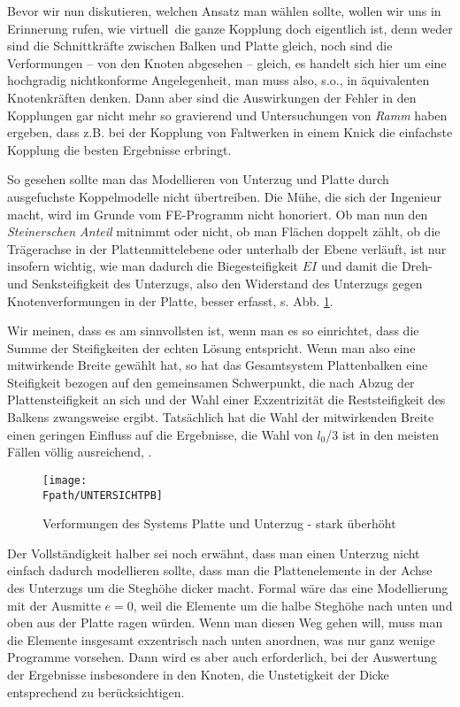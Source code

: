 Bevor wir nun diskutieren, welchen Ansatz man w\"{a}hlen sollte, wollen wir uns in Erinnerung rufen, wie \glq virtuell\grq\ die ganze Kopplung doch eigentlich ist, denn weder sind die Schnittkr\"{a}fte zwischen Balken und Platte gleich, noch sind die Verformungen -- von den Knoten abgesehen -- gleich, es handelt sich hier um eine hochgradig nichtkonforme Angelegenheit, man muss also, s.o., in \"{a}quivalenten Knotenkr\"{a}ften denken. Dann aber sind die Auswirkungen der Fehler in den Kopplungen gar nicht mehr so gravierend und Untersuchungen von {\em Ramm\/} \cite{Ramm4} haben ergeben, dass z.B. bei der Kopplung von Faltwerken in einem Knick die einfachste Kopplung die besten Ergebnisse erbringt.

So gesehen sollte man das Modellieren von Unterzug und Platte durch ausgefuchste Koppelmodelle nicht \"{u}bertreiben. Die M\"{u}he, die sich der Ingenieur macht, wird im Grunde vom FE-Programm nicht honoriert. Ob man nun den {\em Steinerschen Anteil\/} mitnimmt oder nicht, ob man Fl\"{a}chen doppelt z\"{a}hlt, ob die Tr\"{a}gerachse in der Plattenmittelebene oder unterhalb der Ebene verl\"{a}uft, ist nur insofern wichtig, wie man dadurch die Biegesteifigkeit $EI$ und damit die Dreh- und Senksteifigkeit des Unterzugs, also den Widerstand des Unterzugs gegen Knotenverformungen in der Platte, besser erfasst, s. Abb. \ref{UntersichtPB}.

Wir meinen, dass es am sinnvollsten ist, wenn man es so einrichtet, dass die Summe der Steifigkeiten der echten L\"{o}sung entspricht. Wenn man also eine mitwirkende Breite gew\"{a}hlt hat, so hat das Gesamtsystem Plattenbalken eine Steifigkeit bezogen auf den gemeinsamen Schwerpunkt, die nach Abzug der Plattensteifigkeit an sich und der Wahl einer Exzentrizit\"{a}t die Reststeifigkeit des Balkens zwangsweise ergibt. Tats\"{a}chlich hat die Wahl der mitwirkenden Breite einen geringen Einfluss auf die Ergebnisse, die Wahl von $l_0$/3 ist in den meisten F\"{a}llen v\"{o}llig ausreichend,
\cite{Katz1}.
\begin{figure}[tbp]
\centering
\if {} \sidecaption \fi
\texttt{[image: \\Fpath/UNTERSICHTPB]}
\caption{Verformungen des Systems Platte und Unterzug - stark \"{u}berh\"{o}ht}
\label{UntersichtPB}
\end{figure}%


Der Vollst\"{a}ndigkeit halber sei noch erw\"{a}hnt, dass man einen Unterzug nicht einfach dadurch modellieren sollte, dass man die Plattenelemente in der Achse des Unterzugs um die Stegh\"{o}he dicker macht. Formal w\"{a}re das eine Modellierung mit der Ausmitte $e = 0$, weil die Elemente um die halbe Stegh\"{o}he nach unten und oben aus der Platte ragen w\"{u}rden. Wenn man diesen Weg gehen will, muss man die Elemente insgesamt exzentrisch nach unten anordnen, was nur ganz wenige Programme vorsehen. Dann wird es aber auch erforderlich, bei der Auswertung der Ergebnisse insbesondere in den Knoten, die Unstetigkeit der Dicke entsprechend zu ber\"{u}cksichtigen.

